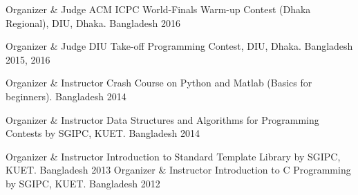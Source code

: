 

\begin{cvhonors}

  \cvhonor
    {Organizer \& Judge} %
    {ACM ICPC World-Finals Warm-up Contest (Dhaka Regional), DIU, Dhaka.} %
    {Bangladesh} %
    {2016} %
  
  \cvhonor
    {Organizer \& Judge} %
    {DIU Take-off Programming Contest, DIU, Dhaka.} %
    {Bangladesh} %
    {2015, 2016} %
    
  \cvhonor
    {Organizer \& Instructor} %
    {Crash Course on Python and Matlab (Basics for beginners).} %
    {Bangladesh} %
    {2014} %
      
  \cvhonor
    {Organizer \& Instructor} %
    {Data Structures and Algorithms for Programming Contests by SGIPC, KUET.} %
    {Bangladesh} %
    {2014} %
  
  \cvhonor
    {Organizer \& Instructor} %
    {Introduction to Standard Template Library by SGIPC, KUET.} %
    {Bangladesh} %
    {2013} %
  \cvhonor
    {Organizer \& Instructor} %
    {Introduction to C Programming by SGIPC, KUET.} %
    {Bangladesh} %
    {2012} %

\end{cvhonors}
